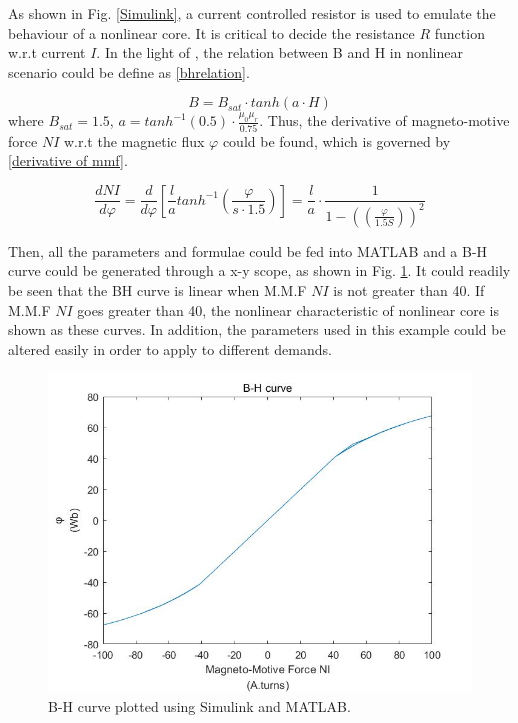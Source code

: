 \documentclass[a4paper]{IEEEtran}
\begin{document}
{As shown in Fig. \ref{Simulink}, a current controlled resistor is used to emulate the behaviour of a nonlinear core.
It is critical to decide the resistance $R$ function w.r.t current $I$. In the light of \cite{Simscape_Electrical}, the relation between B and H in nonlinear scenario
could be define as \eqref{bhrelation}.

\begin{equation}
	B = B_{sat}\cdot tanh(a\cdot H) \label{bhrelation}
\end{equation}
where $B_{sat} = 1.5$, $a=tanh^{-1}(0.5)\cdot \frac{\mu_0\mu_r}{0.75}$. 
Thus, the derivative of magneto-motive force $NI$ w.r.t the magnetic flux $\varphi$ could be found, which is governed by \eqref{derivative of mmf}.

\begin{equation}
	\frac{dNI}{d\varphi}=\frac{d}{d\varphi}\left[\frac{l}{a} tanh^{-1}(\frac{\varphi}{s\cdot 1.5})\right] = \frac{l}{a}\cdot \frac{1}{1-((\frac{\varphi}{1.5S}))^2}\label{derivative of mmf}
\end{equation}

Then, all the parameters and formulae could be fed into MATLAB and a B-H curve could be generated through a x-y scope\cite{Simscape_Electrical}, as shown in Fig. \ref{BHcurve}.
It could readily be seen that the BH curve is linear when M.M.F $NI$ is not greater than 40.
If M.M.F $NI$ goes greater than 40, the nonlinear characteristic of nonlinear core is shown as these curves.
In addition, the parameters used in this example could be altered easily in order to apply to different demands.

\begin{figure}[H]
\begin{centering}
\includegraphics[scale=0.35]{BHcurve.jpg}
\par\end{centering}   
\caption{B-H curve plotted using Simulink and MATLAB.\label{BHcurve}}
\end{figure}  

}
\end{document}
